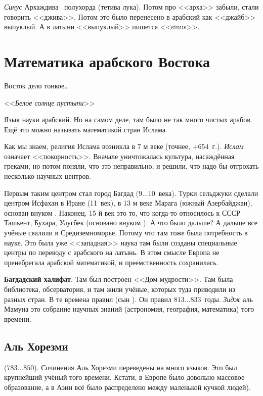 \documentclass[a4paper,oneside,fleqn,10pt]{article}
\newcommand{\pe}[2]{${#1}\ldots{#2}$}
\begin{document}
\emph{Синус}  Архаждива~ полухорда (тетива лука).
Потом про <<арха>> забыли, стали говорить <<джива>>.
Потом это было перенесено в арабский как <<джайб>> выпуклый. А в латыни <<выпуклый>> пишется <<sinus>>.

\section{Математика арабского Востока}

\epigraph{ Восток дело тонкое\ldots\hskip1cm}
         {<<\emph{Белое солнце пустыни}>>}

Язык науки арабский. Но на самом деле, там было не так много чистых
арабов. Ещё это можно называть математикой стран Ислама.

Как мы знаем, религия Ислама возникла в $7$ м веке (точнее, $+654$~г.). \emph{Ислам} означает <<покорность>>.
Вначале уничтожалась культура, насаждённая греками,
но потом поняли, что это неправильно, и решили, что надо бы отгрохать несколько научных центров.

Первым таким центром стал город Багдад (\pe{9}{10}~века). Турки сельджуки сделали центром Исфахан
в Иране (11~век), в 13 м веке Марага (южный Азербайджан), основан внуком .
Наконец, 15 й век это то, что когда-то относилось к СССР Ташкент, Бухара,
Улугбек (основано внуком ). А что было дальше? А дальше все учёные свалили в Средиземноморье.
Потому что там тоже была потребность в науке.
Это была уже <<западная>> наука там были созданы специальные центры по переводу с арабского
на латынь. В этом смысле Европа не пренебрегала арабской математикой,
и преемственность сохранилась.

\textbf{Багдадский халифат}. Там был построен <<Дом мудрости>>. Там была библиотека, обсерватория, и там жили
учёные, которых туда приводили из разных стран.  В те времена правил  (сын
).
Он правил \pe{813}{833}~годы. \emph{Зидж} аль Мамуна это собрание научных знаний
(астрономия, география, математика) того времени.

\subsection{Аль Хорезми}

 (\pe{783}{850}). Сочинения Аль Хорезми переведены на много языков. Это был крупнейший
учёный того времени. Кстати, в Европе было довольно массовое образование, а в Азии всё было распределено между
маленькой кучкой людей).
\end{document}
